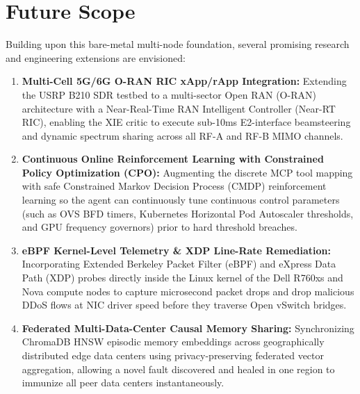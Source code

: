 \section{Future Scope}
Building upon this bare-metal multi-node foundation, several promising research and engineering extensions are envisioned:
\begin{enumerate}
    \item \textbf{Multi-Cell 5G/6G O-RAN RIC xApp/rApp Integration:} Extending the USRP B210 SDR testbed to a multi-sector Open RAN (O-RAN) architecture with a Near-Real-Time RAN Intelligent Controller (Near-RT RIC), enabling the XIE critic to execute sub-10ms E2-interface beamsteering and dynamic spectrum sharing across all RF-A and RF-B MIMO channels.
    \item \textbf{Continuous Online Reinforcement Learning with Constrained Policy Optimization (CPO):} Augmenting the discrete MCP tool mapping with safe Constrained Markov Decision Process (CMDP) reinforcement learning so the agent can continuously tune continuous control parameters (such as OVS BFD timers, Kubernetes Horizontal Pod Autoscaler thresholds, and GPU frequency governors) prior to hard threshold breaches.
    \item \textbf{eBPF Kernel-Level Telemetry \& XDP Line-Rate Remediation:} Incorporating Extended Berkeley Packet Filter (eBPF) and eXpress Data Path (XDP) probes directly inside the Linux kernel of the Dell R760xs and Nova compute nodes to capture microsecond packet drops and drop malicious DDoS flows at NIC driver speed before they traverse Open vSwitch bridges.
    \item \textbf{Federated Multi-Data-Center Causal Memory Sharing:} Synchronizing ChromaDB HNSW episodic memory embeddings across geographically distributed edge data centers using privacy-preserving federated vector aggregation, allowing a novel fault discovered and healed in one region to immunize all peer data centers instantaneously.
\end{enumerate}

